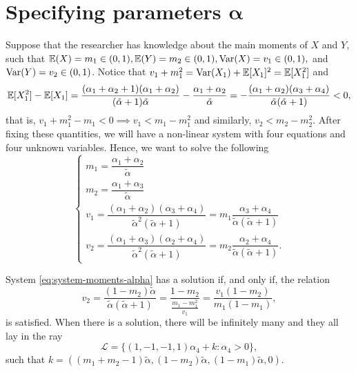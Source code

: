 \section{Specifying parameters
\texorpdfstring{$\boldsymbol{\alpha}$}{alpha}}

Suppose that the researcher has knowledge about the main moments of $X$ and
$Y$, such that $\mathbb{E}(X) = m_1 \in (0,1), \mathbb{E}(Y) = m_2 \in (0,1), \operatorname{Var}(X) = v_1
\in (0, 1),$ and $\operatorname{Var}(Y) =
v_2 \in (0,1)$. Notice that $v_1 + m_1^2 = \operatorname{Var}(X_1) + \mathbb{E}[X_1]^2 = \mathbb{E}[X_1^2]$ and
$$
\mathbb{E}[X_1^2] - \mathbb{E}[X_1] = \frac{(\alpha_1 + \alpha_2 + 1)(\alpha_1 + \alpha_2)}{(\tilde{\alpha} + 1)\tilde{\alpha}} - \frac{\alpha_1 + \alpha_2}{\tilde{\alpha}} = -\frac{(\alpha_1 + \alpha_2)(\alpha_3 + \alpha_4)}{\tilde{\alpha}(\tilde{\alpha}+1)} < 0, 
$$
that is, $v_1 + m_1^2 - m_1 < 0 \implies v_1 < m_1 - m_1^2$ and similarly,
$v_2 < m_2 - m_2^2$. After fixing these quantities, we will have a non-linear system with four equations and four
unknown variables. Hence, we want to solve the following 
\begin{equation}
  \label{eq:system-moments-alpha}
  \begin{cases}
    m_1 = \dfrac{\alpha_1+\alpha_2}{\tilde{\alpha}} \\
    m_2 = \dfrac{\alpha_1+\alpha_3}{\tilde{\alpha}} \\ 
    v_1 = \dfrac{(\alpha_1+\alpha_2)(\alpha_3+\alpha_4)}{\tilde{\alpha}^2(\tilde{\alpha}+1)} = m_1\dfrac{\alpha_3+\alpha_4}{\tilde{\alpha}(\tilde{\alpha}+1)} \\
    v_2 = \dfrac{(\alpha_1+\alpha_3)(\alpha_2+\alpha_4)}{\tilde{\alpha}^2(\tilde{\alpha}+1)} = m_2\dfrac{\alpha_2+\alpha_4}{\tilde{\alpha}(\tilde{\alpha}+1)}.
  \end{cases}
\end{equation}

\begin{proposition}
  System \eqref{eq:system-moments-alpha} has a solution if, and only if, the relation
  \begin{equation}
    \label{eq:v2}
    v_2 = \frac{(1 - m_2)\tilde{\alpha}}{\tilde{\alpha}(\tilde{\alpha}+ 1)} = \frac{1 - m_2}{\frac{m_1 - m_1^2}{v_1}} = \frac{v_1(1 - m_2)}{m_1(1-m_1)},
  \end{equation}
  is satisfied. When there is a solution, there will be
  infinitely many and they all lay in the ray 
  $$
\mathcal{L} = \{(1,-1,-1,1)\alpha_4 + k : \alpha_4 > 0\}, 
$$
such that $k = \left((m_1 + m_2 - 1)\tilde{\alpha}, (1-m_2)\tilde{\alpha},
(1-m_1)\tilde{\alpha}, 0\right)$. 
\end{proposition}

